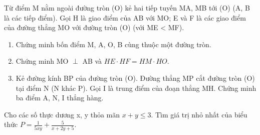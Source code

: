 \begin{ex}
	Từ điểm M nằm ngoài đường tròn (O) kẻ hai tiếp tuyến MA, MB tới (O) (A, B là các tiếp điểm). Gọi H là giao điểm của AB với MO; E và F là các giao điểm của đường thẳng MO với đường tròn (O) (với ME < MF).
	\begin{enumerate}
		\item[1.] Chứng minh bốn điểm M, A, O, B cùng thuộc một đường tròn.
		\item[2.] Chứng minh MO $\perp$ AB và $HE \cdot HF = HM \cdot HO$.
		\item[3.] Kẻ đường kính BP của đường tròn (O). Đường thẳng MP cắt đường tròn (O) tại điểm N (N khác P). Gọi I là trung điểm của đoạn thẳng MH. Chứng minh ba điểm A, N, I thẳng hàng.
	\end{enumerate}
\end{ex}

\begin{ex}
	Cho các số thực dương x, y thỏa mãn $x+y \le 3$.
	Tìm giá trị nhỏ nhất của biểu thức $P = \frac{1}{5xy} + \frac{5}{x+2y+5}$.
\end{ex}

